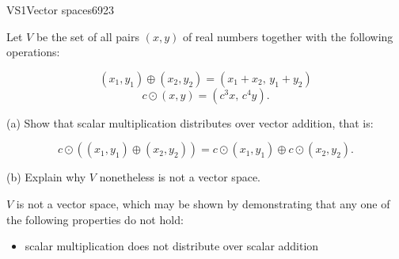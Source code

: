 \begin{exercise}{VS1}{Vector spaces}{6923} 
\begin{exerciseStatement} 

 Let \(V\) be the set of all pairs \((x,y)\) of real numbers together with the following operations: 

 \[(x_1,y_1)\oplus (x_2,y_2)=\left(x_{1} + x_{2},\,y_{1} + y_{2}\right)\]\[c \odot (x,y) =\left(c^{3} x,\,c^{4} y\right).\] 

 (a) Show that scalar multiplication distributes over vector addition, that is: 

 \[
      c\odot \left((x_1,y_1)\oplus(x_2,y_2)\right)=c\odot(x_1,y_1)\oplus c\odot(x_2,y_2).
    \] 

 (b) Explain why \(V\) nonetheless is not a vector space. 

 \end{exerciseStatement}
 \begin{exerciseAnswer} 

 \(V\) is not a vector space, which may be shown by demonstrating that any one of the following properties do not hold: 

 

\begin{itemize}
\item scalar multiplication does not distribute over scalar addition
\end{itemize}

     \end{exerciseAnswer}
 \end{exercise}


